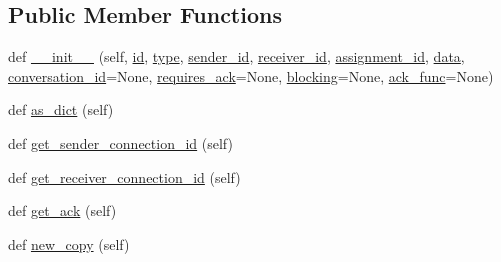 \subsection*{Public Member Functions}
\begin{DoxyCompactItemize}
\item 
def \hyperlink{classparlai_1_1mturk_1_1core_1_1socket__manager_1_1Packet_a25f1f794ffd01fb70e9b6b8acd0a33be}{\+\_\+\+\_\+init\+\_\+\+\_\+} (self, \hyperlink{classparlai_1_1mturk_1_1core_1_1socket__manager_1_1Packet_ad10710f49279e55b1011f585fd07bc22}{id}, \hyperlink{classparlai_1_1mturk_1_1core_1_1socket__manager_1_1Packet_a6fbd30031c46914f55a9ccdec5b0c8a3}{type}, \hyperlink{classparlai_1_1mturk_1_1core_1_1socket__manager_1_1Packet_ae1bd1f29599a19fd8c64e2ef01ab77b4}{sender\+\_\+id}, \hyperlink{classparlai_1_1mturk_1_1core_1_1socket__manager_1_1Packet_ab45007199f720f99765a49771df71c58}{receiver\+\_\+id}, \hyperlink{classparlai_1_1mturk_1_1core_1_1socket__manager_1_1Packet_a1638aa8fb2f521dcc47a3c70bb4629d0}{assignment\+\_\+id}, \hyperlink{classparlai_1_1mturk_1_1core_1_1socket__manager_1_1Packet_a0da381513a2cef8db0a5cac7825aa8f4}{data}, \hyperlink{classparlai_1_1mturk_1_1core_1_1socket__manager_1_1Packet_a1131b2ba6f1534a3edd9f704ae5db107}{conversation\+\_\+id}=None, \hyperlink{classparlai_1_1mturk_1_1core_1_1socket__manager_1_1Packet_af0fd46eb878559d3ea82993aa4c2ad9a}{requires\+\_\+ack}=None, \hyperlink{classparlai_1_1mturk_1_1core_1_1socket__manager_1_1Packet_ace59fc70911f5349259a6e09541ef776}{blocking}=None, \hyperlink{classparlai_1_1mturk_1_1core_1_1socket__manager_1_1Packet_a676008ae4aaa55d7551a94d246b1b931}{ack\+\_\+func}=None)
\item 
def \hyperlink{classparlai_1_1mturk_1_1core_1_1socket__manager_1_1Packet_a805fbc99169620a4a3c37a7892b5fab3}{as\+\_\+dict} (self)
\item 
def \hyperlink{classparlai_1_1mturk_1_1core_1_1socket__manager_1_1Packet_ad472844f177969be64004bc0fd7031d9}{get\+\_\+sender\+\_\+connection\+\_\+id} (self)
\item 
def \hyperlink{classparlai_1_1mturk_1_1core_1_1socket__manager_1_1Packet_af13faca81d70ad1768e6dd0089c8e082}{get\+\_\+receiver\+\_\+connection\+\_\+id} (self)
\item 
def \hyperlink{classparlai_1_1mturk_1_1core_1_1socket__manager_1_1Packet_a92f4ae50a21d22ab63b041f23d210928}{get\+\_\+ack} (self)
\item 
def \hyperlink{classparlai_1_1mturk_1_1core_1_1socket__manager_1_1Packet_a308912fbfb5d9423d882100db5c79756}{new\+\_\+copy} (self)

\end{DoxyCompactItemize}
